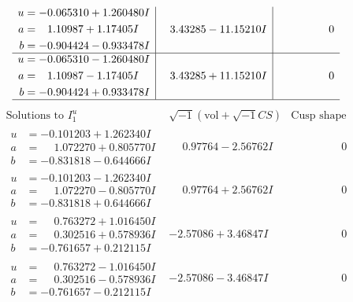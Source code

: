 \documentclass[1p]{elsarticle_modified}
\theoremstyle{definition}
\newcommand{\I}{\sqrt{-1}}
\begin{document}
$$\begin{array}{c|c|c}
\begin{aligned}
u &= -0.065310 + 1.260480 I \\
a &= \phantom{-}1.10987 + 1.17405 I \\
b &= -0.904424 - 0.933478 I\end{aligned}
 & \phantom{-}3.43285 - 11.15210 I & \phantom{-0.000000 } 0 \\ \hline\begin{aligned}
u &= -0.065310 - 1.260480 I \\
a &= \phantom{-}1.10987 - 1.17405 I \\
b &= -0.904424 + 0.933478 I\end{aligned}
 & \phantom{-}3.43285 + 11.15210 I & \phantom{-0.000000 } 0\\
 \hline 
 \end{array}$$\newpage$$\begin{array}{c|c|c}  
\text{Solutions to }I^u_{1}& \I (\text{vol} + \sqrt{-1}CS) & \text{Cusp shape}\\
 \hline 
\begin{aligned}
u &= -0.101203 + 1.262340 I \\
a &= \phantom{-}1.072270 + 0.805770 I \\
b &= -0.831818 - 0.644666 I\end{aligned}
 & \phantom{-}0.97764 - 2.56762 I & \phantom{-0.000000 } 0 \\ \hline\begin{aligned}
u &= -0.101203 - 1.262340 I \\
a &= \phantom{-}1.072270 - 0.805770 I \\
b &= -0.831818 + 0.644666 I\end{aligned}
 & \phantom{-}0.97764 + 2.56762 I & \phantom{-0.000000 } 0 \\ \hline\begin{aligned}
u &= \phantom{-}0.763272 + 1.016450 I \\
a &= \phantom{-}0.302516 + 0.578936 I \\
b &= -0.761657 + 0.212115 I\end{aligned}
 & -2.57086 + 3.46847 I & \phantom{-0.000000 } 0 \\ \hline\begin{aligned}
u &= \phantom{-}0.763272 - 1.016450 I \\
a &= \phantom{-}0.302516 - 0.578936 I \\
b &= -0.761657 - 0.212115 I\end{aligned}
 & -2.57086 - 3.46847 I & \phantom{-0.000000 } 0 \\ \hline\begin{aligned}

\end{aligned}
\end{array}$$
\end{document}
